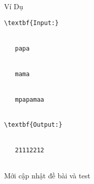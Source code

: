 Ví Dụ
\begin{verbatim}
\textbf{Input:}


   papa


   mama


   mpapamaa


\textbf{Output:}


   21112212


\end{verbatim}
	\item    Mới cập nhật đề bài và test